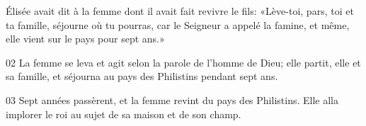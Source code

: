 Élisée avait dit à la femme dont il avait fait revivre le fils: «Lève-toi, pars, toi et ta famille, séjourne où tu pourras, car le Seigneur a appelé la famine, et même, elle vient sur le pays pour sept ans.»

02 La femme se leva et agit selon la parole de l’homme de Dieu; elle partit, elle et sa famille, et séjourna au pays des Philistins pendant sept ans.

03 Sept années passèrent, et la femme revint du pays des Philistins. Elle alla implorer le roi au sujet de sa maison et de son champ.
